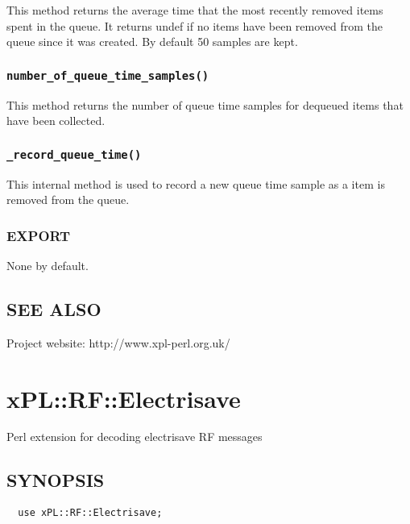 This method returns the average time that the most recently removed
items spent in the queue.  It returns undef if no items have been
removed from the queue since it was created.  By default 50 samples
are kept.

\subsubsection*{\texttt{number\_of\_queue\_time\_samples()}\label{xPL::Queue_number_of_queue_time_samples_}}


This method returns the number of queue time samples for dequeued
items that have been collected.

\subsubsection*{\texttt{\_record\_queue\_time()}\label{xPL::Queue__record_queue_time_}}


This internal method is used to record a new queue time sample as a
item is removed from the queue.

\subsubsection*{EXPORT\label{xPL::Queue_EXPORT}}


None by default.

\subsection*{SEE ALSO\label{xPL::Queue_SEE_ALSO}}


Project website: http://www.xpl-perl.org.uk/

\section{xPL::RF::Electrisave\label{xPL::RF::Electrisave}}


Perl extension for decoding electrisave RF messages

\subsection*{SYNOPSIS\label{xPL::RF::Electrisave_SYNOPSIS}}
\begin{verbatim}
  use xPL::RF::Electrisave;
\end{verbatim}
